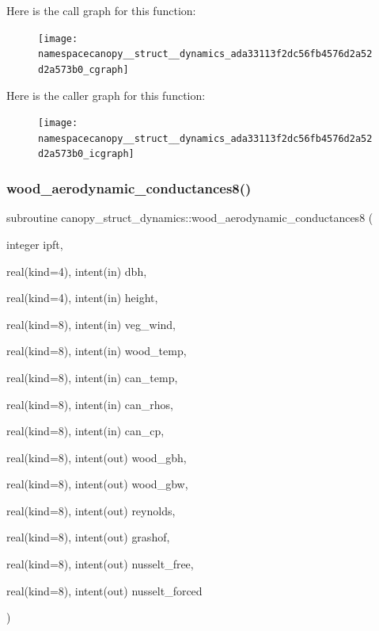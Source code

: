 Here is the call graph for this function\+:
\nopagebreak
\begin{figure}[H]
\begin{center}
\leavevmode
\texttt{[image: namespacecanopy\_\_struct\_\_dynamics\_ada33113f2dc56fb4576d2a52d2a573b0\_cgraph]}
\end{center}
\end{figure}
Here is the caller graph for this function\+:
\nopagebreak
\begin{figure}[H]
\begin{center}
\leavevmode
\texttt{[image: namespacecanopy\_\_struct\_\_dynamics\_ada33113f2dc56fb4576d2a52d2a573b0\_icgraph]}
\end{center}
\end{figure}
\mbox{\label{namespacecanopy__struct__dynamics_a0c4e4737235809c386a5b5cab02086f1}} 
\subsubsection{\texorpdfstring{wood\+\_\+aerodynamic\+\_\+conductances8()}{wood\_aerodynamic\_conductances8()}}
{\footnotesize\ttfamily subroutine canopy\+\_\+struct\+\_\+dynamics\+::wood\+\_\+aerodynamic\+\_\+conductances8 (\begin{DoxyParamCaption}\item[{integer}]{ipft,  }\item[{real(kind=4), intent(in)}]{dbh,  }\item[{real(kind=4), intent(in)}]{height,  }\item[{real(kind=8), intent(in)}]{veg\+\_\+wind,  }\item[{real(kind=8), intent(in)}]{wood\+\_\+temp,  }\item[{real(kind=8), intent(in)}]{can\+\_\+temp,  }\item[{real(kind=8), intent(in)}]{can\+\_\+rhos,  }\item[{real(kind=8), intent(in)}]{can\+\_\+cp,  }\item[{real(kind=8), intent(out)}]{wood\+\_\+gbh,  }\item[{real(kind=8), intent(out)}]{wood\+\_\+gbw,  }\item[{real(kind=8), intent(out)}]{reynolds,  }\item[{real(kind=8), intent(out)}]{grashof,  }\item[{real(kind=8), intent(out)}]{nusselt\+\_\+free,  }\item[{real(kind=8), intent(out)}]{nusselt\+\_\+forced }\end{DoxyParamCaption})}

